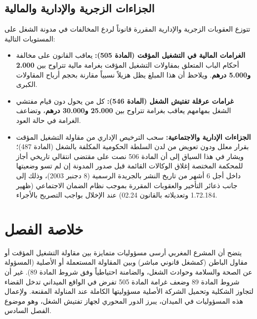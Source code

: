 \subsection{الجزاءات الزجرية والإدارية والمالية}
تتوزع العقوبات الزجرية والإدارية المقررة قانوناً لردع المخالفات في مدونة الشغل على المستويات التالية:
\begin{itemize}[leftmargin=*, itemsep=5pt]
    \item \textbf{الغرامات المالية في التشغيل المؤقت (المادة \textenglish{505}):} يعاقب القانون على مخالفة أحكام الباب المتعلق بمقاولات التشغيل المؤقت بغرامة مالية تتراوح بين \textbf{\textenglish{2.000} و\textenglish{5.000} درهم}. ويلاحظ أن هذا المبلغ يظل هزيلاً نسبياً مقارنة بحجم أرباح المقاولات الكبرى.
    \item \textbf{غرامات عرقلة تفتيش الشغل (المادة \textenglish{546}):} كل من يحول دون قيام مفتشي الشغل بمهامهم يعاقب بغرامة تتراوح بين \textbf{\textenglish{25.000} و\textenglish{30.000} درهم}، وتضاعف الغرامة في حالة العود.
    \item \textbf{الجزاءات الإدارية والاجتماعية:} سحب الترخيص الإداري من مقاولة التشغيل المؤقت بقرار معلل ودون تعويض من لدن السلطة الحكومية المكلفة بالشغل (المادة \textenglish{487})؛ ويشار في هذا السياق إلى أن المادة \textenglish{506} نصت على مقتضى انتقالي تاريخي أجاز للمحكمة المختصة إغلاق الوكالات القائمة قبل صدور المدونة إن لم تسو وضعيتها داخل أجل \textenglish{6} أشهر من تاريخ النشر بالجريدة الرسمية (\textenglish{8} دجنبر \textenglish{2003})، وذلك إلى جانب ذعائر التأخير والعقوبات المقررة بموجب نظام الضمان الاجتماعي (ظهير \textenglish{1.72.184} وتعديلاته بالقانون \textenglish{02.24}) عند الإخلال بواجب التصريح بالأجراء.
\end{itemize}

\section*{خلاصة الفصل}

يتضح أن المشرع المغربي أرسى مسؤوليات متمايزة بين مقاولة التشغيل المؤقت أو مقاول الباطن (كمشغل قانوني مباشر) وبين المقاولة المستعملة أو الأصلية (المسؤولة عن الصحة والسلامة وحوادث الشغل، والضامنة احتياطياً وفق شروط المادة \textenglish{89}). غير أن شروط المادة \textenglish{89} وضعف غرامة المادة \textenglish{505} تفرض في الواقع الميداني تدخل القضاء لتجاوز الشكلية وتحميل الشركة الأصلية مسؤوليتها الكاملة عند المناولة المقنعة. ولإعمال هذه المسؤوليات في الميدان، يبرز الدور المحوري لجهاز تفتيش الشغل، وهو موضوع الفصل السادس.
